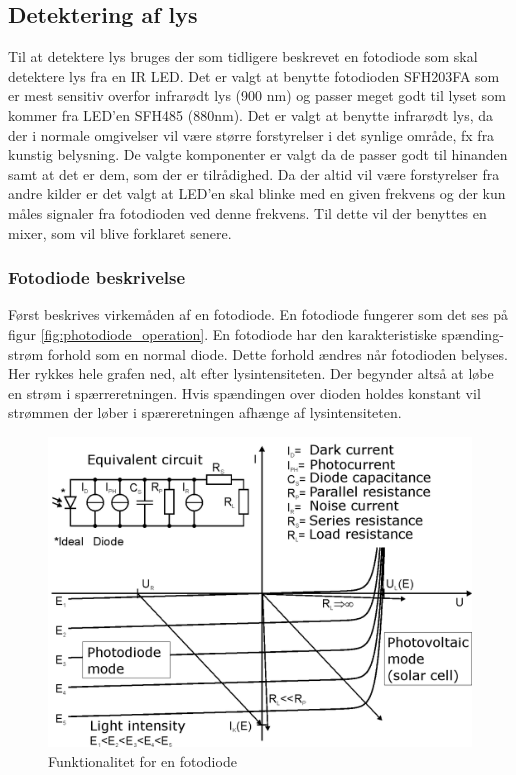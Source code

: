 \documentclass[HardwareDesign/HardwareDesign_main.tex]{subfiles}
\begin{document}
\subsection{Detektering af lys}

Til at detektere lys bruges der som tidligere beskrevet en fotodiode som skal detektere lys fra en IR LED. 
Det er valgt at benytte fotodioden SFH203FA som er mest sensitiv overfor infrarødt lys (900 nm) og passer meget godt til lyset som kommer fra LED'en SFH485 (880nm). Det er valgt at benytte infrarødt lys, da der i normale omgivelser vil være større forstyrelser i det synlige område, fx fra kunstig belysning. De valgte komponenter er valgt da de passer godt til hinanden samt at det er dem, som der er tilrådighed. 
Da der altid vil være forstyrelser fra andre kilder er det valgt at LED'en skal blinke med en given frekvens og der kun måles signaler fra fotodioden ved denne frekvens. Til dette vil der benyttes en mixer, som vil blive forklaret senere. 

\subsubsection{Fotodiode beskrivelse}
Først beskrives virkemåden af en fotodiode. En fotodiode fungerer som det ses på figur \ref{fig:photodiode_operation}. En fotodiode har den karakteristiske spænding-strøm forhold som en normal diode. Dette forhold ændres når fotodioden belyses. Her rykkes hele grafen ned, alt efter lysintensiteten. Der begynder altså at løbe en strøm i spærreretningen. Hvis spændingen over dioden holdes konstant vil strømmen der løber i spæreretningen afhænge af lysintensiteten. 
\begin{figure}[H]
    \centering
    \includegraphics[width=\textwidth]{HardwareDesign/CupSensor/graphics/Photodiode_operation.png}
    \caption{Funktionalitet for en fotodiode}
    \label{fig:PhotodiodeTestDiagram}
\end{figure}
\end{document}
